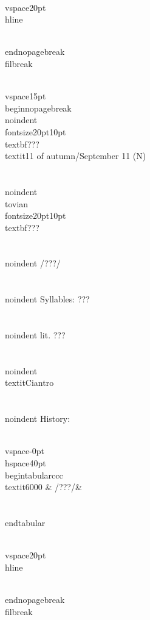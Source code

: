 \\vspace{20pt}\\hline

\\end{nopagebreak}
\\filbreak



\\vspace{15pt}
\\begin{nopagebreak}
\\noindent{\\fontsize{20pt}{10pt}\\textbf{???} } \\textit{11 of autumn/September 11} (N)\\\\
\\noindent {\\tovian \\fontsize{20pt}{10pt} \\textbf{???} }\\\\
\\noindent /???/\\\\
\\noindent Syllables: ???\\\\
\\noindent lit. ???\\\\
\\noindent \\textit{Ciantro}\\\\


\\noindent History:

\\vspace{-0pt}
\\hspace{40pt}
\\begin{tabular}{ccc}
\\textit{6000} & /???/& \\\\
\\end{tabular}

\\vspace{20pt}\\hline

\\end{nopagebreak}
\\filbreak



